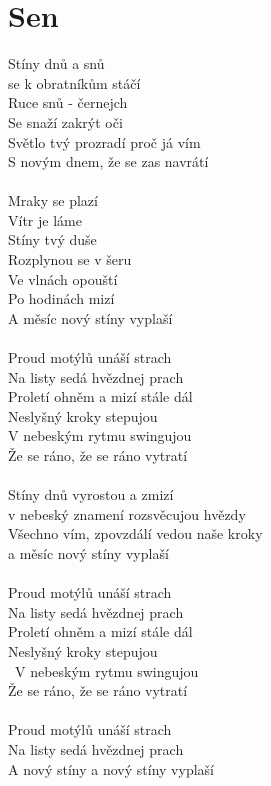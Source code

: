 \section{Sen}
Stíny dnů a snů\\
se k obratníkům stáčí\\
Ruce snů - černejch\\
Se snaží zakrýt oči\\
Světlo tvý prozradí proč já vím\\
S novým dnem, že se zas navrátí\\
\\
Mraky se plazí\\
Vítr je láme\\
Stíny tvý duše\\
Rozplynou se v šeru\\
Ve vlnách opouští\\
Po hodinách mizí\\
A měsíc nový stíny vyplaší\\
\\
Proud motýlů unáší strach\\
Na listy sedá hvězdnej prach\\
Proletí ohněm a mizí stále dál\\
Neslyšný kroky stepujou\\
V nebeským rytmu swingujou\\
Že se ráno, že se ráno vytratí\\
\\
Stíny dnů vyrostou a zmizí\\
v nebeský znamení rozsvěcujou hvězdy\\
Všechno vím, zpovzdálí vedou naše kroky\\
a měsíc nový stíny vyplaší\\
\\
Proud motýlů unáší strach\\
Na listy sedá hvězdnej prach\\
Proletí ohněm a mizí stále dál\\
Neslyšný kroky stepujou\\\
V nebeským rytmu swingujou\\
Že se ráno, že se ráno vytratí\\
\\
Proud motýlů unáší strach\\
Na listy sedá hvězdnej prach\\
A nový stíny a nový stíny vyplaší\\
